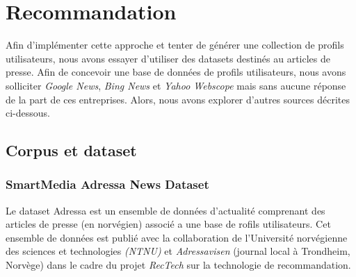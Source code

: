\newpage
\section{Recommandation}

Afin d'implémenter cette approche et tenter de générer une collection de profils utilisateurs, nous avons essayer d'utiliser des datasets destinés au articles de presse. Afin de concevoir une base de données de profils utilisateurs, nous avons solliciter \emph{Google News}\cite{bibid}, \emph{Bing News}\cite{bibid} et \emph{Yahoo Webscope} \cite{bibid} mais sans aucune réponse de la part de ces entreprises. Alors, nous avons explorer d'autres sources décrites ci-dessous.

\subsection{Corpus et dataset}
    \subsubsection{SmartMedia Adressa News Dataset}
    Le dataset Adressa est un ensemble de données d'actualité comprenant des articles de presse (en norvégien) associé a une base de rofils utilisateurs. Cet ensemble de données est publié avec la collaboration de l'Université norvégienne des sciences et technologies \emph{(NTNU)} et \emph{Adressavisen} (journal local à Trondheim, Norvège) dans le cadre du projet \emph{RecTech} sur la technologie de recommandation.\cite{refnorvege}

